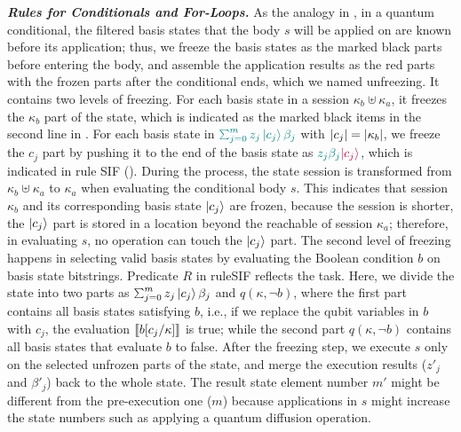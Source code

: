 \noindent\textbf{\textit{Rules for Conditionals and For-Loops.}}\label{sec:conditionals}
As the analogy in ,
in a quantum conditional, the filtered basis states that the body $s$ will be applied on are known before its application; thus, we freeze the basis states as the marked black parts before entering the body, and assemble the application results as the red parts with the frozen parts after the conditional ends, which we named unfreezing.
It contains two levels of freezing. For each basis state in a session $\kappa_b\uplus \kappa_a$, it freezes the $\kappa_b$ part of the state, which is indicated as the marked black items in the second line in .
 For each basis state in $\textcolor{teal}{\scha{m}{z_j}{c_{j}}{\beta_j}}$ with $|c_{j}| = |\kappa_b|$, we freeze the $c_{j}$ part by pushing it to the end of the basis state as $\textcolor{teal}{z_j\beta_j}\textcolor{purple}{\left\vert{c_{j}}\right\rangle}$, which is indicated in rule \textsc{SIF} (). 
During the process, the state session is transformed from $\kappa_b\uplus \kappa_a$ to $\kappa_a$ when evaluating the conditional body $s$. This indicates that session $\kappa_b$ and its corresponding basis state $\left\vert{c_{j}}\right\rangle$ are frozen, because the session is shorter, the $\left\vert{c_{j}}\right\rangle$ part is stored in a location beyond the reachable of session $\kappa_a$; therefore, in evaluating $s$, no operation can touch the $\left\vert{c_{j}}\right\rangle$ part.
The second level of freezing happens in selecting valid basis states by evaluating the Boolean condition $b$ on basis state bitstrings. Predicate $R$ in rule\textsc{SIF} reflects the task.
Here, we divide the state into two parts as $\scha{m}{z_j}{c_{j}}{\beta_j}$ and $q(\kappa,\neg b)$, where the first part contains all basis states satisfying $b$, i.e., if we replace the qubit variables in $b$ with $c_{j}$, the evaluation $\llbracket b[c_{j}/\kappa] \rrbracket$ is true; while the second part $q(\kappa,\neg b)$ contains all basis states that evaluate $b$ to false.
After the freezing step, we execute $s$ only on the selected unfrozen parts of the state, and merge the execution results ($z'_j$ and $\beta'_j$) back to the whole state.
The result state element number $m'$ might be different from the pre-execution one ($m$) because applications in $s$ might increase the state numbers such as applying a quantum diffusion operation.

